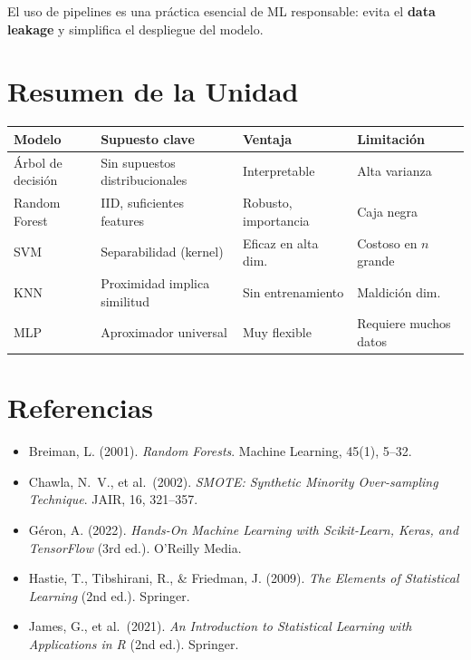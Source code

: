 \documentclass[12pt, a4paper]{article}
\theoremstyle{definition}
\theoremstyle{plain}
\theoremstyle{remark}
\begin{document}
\begin{conceptoclave}
  El uso de pipelines es una práctica esencial de ML responsable: evita el \textbf{data leakage} y simplifica el despliegue del modelo.
\end{conceptoclave}

\section*{Resumen de la Unidad}

\begin{center}
\begin{tabular}{p{3cm} p{4cm} p{3.5cm} p{3.5cm}}
  \toprule
  \textbf{Modelo} & \textbf{Supuesto clave} & \textbf{Ventaja} & \textbf{Limitación} \\
  \midrule
  Árbol de decisión & Sin supuestos distribucionales & Interpretable & Alta varianza \\
  Random Forest & IID, suficientes features & Robusto, importancia & Caja negra \\
  SVM & Separabilidad (kernel) & Eficaz en alta dim. & Costoso en $n$ grande \\
  KNN & Proximidad implica similitud & Sin entrenamiento & Maldición dim. \\
  MLP & Aproximador universal & Muy flexible & Requiere muchos datos \\
  \bottomrule
\end{tabular}
\end{center}

\section*{Referencias}

\begin{itemize}
  \item Breiman, L. (2001). \textit{Random Forests}. Machine Learning, 45(1), 5--32.
  \item Chawla, N.\ V., et al.\ (2002). \textit{SMOTE: Synthetic Minority Over-sampling Technique}. JAIR, 16, 321--357.
  \item Géron, A. (2022). \textit{Hands-On Machine Learning with Scikit-Learn, Keras, and TensorFlow} (3rd ed.). O'Reilly Media.
  \item Hastie, T., Tibshirani, R., \& Friedman, J. (2009). \textit{The Elements of Statistical Learning} (2nd ed.). Springer.
  \item James, G., et al.\ (2021). \textit{An Introduction to Statistical Learning with Applications in R} (2nd ed.). Springer.
\end{itemize}

\end{document}
